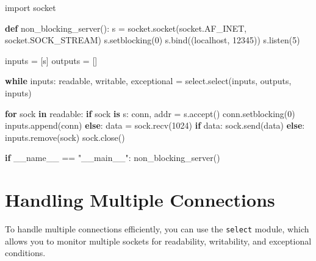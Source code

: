 \documentclass[
  letterpaper,
  DIV=11,
  numbers=noendperiod]{scrreprt}
\newenvironment{Shaded}{\begin{snugshade}}{\end{snugshade}}
\newcommand{\ControlFlowTok}[1]{\textcolor[rgb]{0.00,0.23,0.31}{\textbf{#1}}}
\newcommand{\DecValTok}[1]{\textcolor[rgb]{0.68,0.00,0.00}{#1}}
\newcommand{\ImportTok}[1]{\textcolor[rgb]{0.00,0.46,0.62}{#1}}
\newcommand{\KeywordTok}[1]{\textcolor[rgb]{0.00,0.23,0.31}{\textbf{#1}}}
\newcommand{\NormalTok}[1]{\textcolor[rgb]{0.00,0.23,0.31}{#1}}
\newcommand{\OperatorTok}[1]{\textcolor[rgb]{0.37,0.37,0.37}{#1}}
\newcommand{\StringTok}[1]{\textcolor[rgb]{0.13,0.47,0.30}{#1}}
\newcommand{\VariableTok}[1]{\textcolor[rgb]{0.07,0.07,0.07}{#1}}
\begin{document}
\begin{Shaded}
\begin{Highlighting}[]
\ImportTok{import}\NormalTok{ socket}

\KeywordTok{def}\NormalTok{ non\_blocking\_server():}
\NormalTok{    s }\OperatorTok{=}\NormalTok{ socket.socket(socket.AF\_INET, socket.SOCK\_STREAM)}
\NormalTok{    s.setblocking(}\DecValTok{0}\NormalTok{)}
\NormalTok{    s.bind((}\StringTok{\textquotesingle{}localhost\textquotesingle{}}\NormalTok{, }\DecValTok{12345}\NormalTok{))}
\NormalTok{    s.listen(}\DecValTok{5}\NormalTok{)}
    
\NormalTok{    inputs }\OperatorTok{=}\NormalTok{ [s]}
\NormalTok{    outputs }\OperatorTok{=}\NormalTok{ []}
    
    \ControlFlowTok{while}\NormalTok{ inputs:}
\NormalTok{        readable, writable, exceptional }\OperatorTok{=}\NormalTok{ select.select(inputs, outputs, inputs)}
        
        \ControlFlowTok{for}\NormalTok{ sock }\KeywordTok{in}\NormalTok{ readable:}
            \ControlFlowTok{if}\NormalTok{ sock }\KeywordTok{is}\NormalTok{ s:}
\NormalTok{                conn, addr }\OperatorTok{=}\NormalTok{ s.accept()}
\NormalTok{                conn.setblocking(}\DecValTok{0}\NormalTok{)}
\NormalTok{                inputs.append(conn)}
            \ControlFlowTok{else}\NormalTok{:}
\NormalTok{                data }\OperatorTok{=}\NormalTok{ sock.recv(}\DecValTok{1024}\NormalTok{)}
                \ControlFlowTok{if}\NormalTok{ data:}
\NormalTok{                    sock.send(data)}
                \ControlFlowTok{else}\NormalTok{:}
\NormalTok{                    inputs.remove(sock)}
\NormalTok{                    sock.close()}

\ControlFlowTok{if} \VariableTok{\_\_name\_\_} \OperatorTok{==} \StringTok{"\_\_main\_\_"}\NormalTok{:}
\NormalTok{    non\_blocking\_server()}
\end{Highlighting}
\end{Shaded}

\section{Handling Multiple
Connections}\label{handling-multiple-connections}

To handle multiple connections efficiently, you can use the
\texttt{select} module, which allows you to monitor multiple sockets for
readability, writability, and exceptional conditions.
\end{document}
